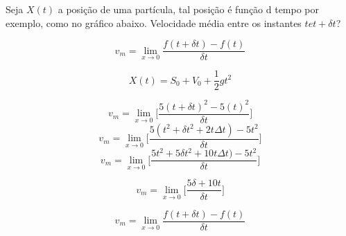 \documentclass[a4paper,12pt]{article}
\begin{document}
\subject{A Questao da Velocidade Instantanea.}
Seja $X(t)$ a posição de uma partícula, tal posição é função d tempo por exemplo, como no gráfico abaixo.
Velocidade média entre os instantes $t e t + \delta t$?

$$v_m = \lim_{x\to 0}\frac{f(t + \delta t) - f(t)}{\delta t}$$

$$X(t) = S_0 + V_0 + \frac{1}{2}gt^2$$

$$v_m = \lim_{x\to 0}\lbrack\frac{5(t + \delta t)^2 - 5(t)^2}{\delta t}\rbrack$$
$$v_m = \lim_{x\to 0}\lbrack\frac{5(t^2 + \delta t^2 + 2t\Delta t) - 5t^2}{\delta t}\rbrack$$
$$v_m = \lim_{x\to 0}\lbrack\frac{5t^2 + 5\delta t^2 + 10t\Delta t) - 5t^2}{\delta t}\rbrack$$

$$v_m = \lim_{x\to 0}\lbrack\frac{5\delta + 10t}{\delta t}\rbrack$$

$$v_m = \lim_{x\to 0}\frac{f(t + \delta t) - f(t)}{\delta t}$$
\end{document}
